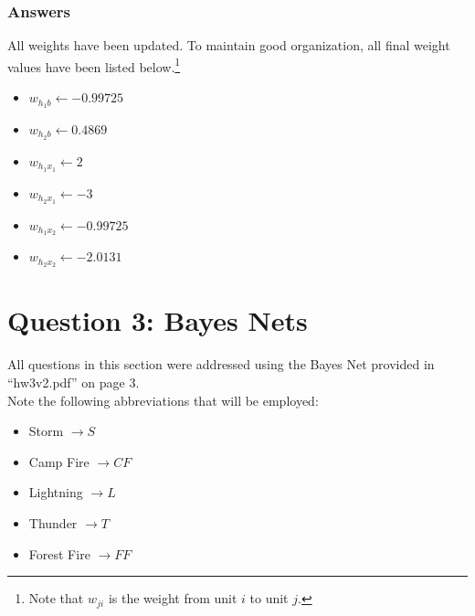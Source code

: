 \documentclass[12pt,letterpaper]{article}
\begin{document}
\subsubsection{Answers}
All weights have been updated. To maintain good organization, all final weight values have been listed below.\footnote{Note that $w_{ji}$ is the weight from unit $i$ to unit $j$.}
\begin{itemize}
\item $w_{h_1b} \leftarrow -0.99725$
\item $w_{h_2b} \leftarrow 0.4869$
\item $w_{h_1x_1} \leftarrow 2$
\item $w_{h_2x_1} \leftarrow -3$
\item $w_{h_1x_2} \leftarrow -0.99725$
\item $w_{h_2x_2} \leftarrow -2.0131$
\end{itemize}
\section{Question 3: Bayes Nets}
All questions in this section were addressed using the Bayes Net provided in ``hw3v2.pdf'' on page 3.\\
Note the following abbreviations that will be employed:
\begin{itemize}
\item Storm $\rightarrow S$
\item Camp Fire $\rightarrow CF$
\item Lightning $\rightarrow L$
\item Thunder $\rightarrow T$
\item Forest Fire $\rightarrow FF$
\end{itemize}
\end{document}

